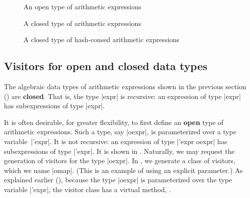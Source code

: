 \documentclass[11pt,a4paper,twoside]{article}
\renewcommand{\emph}[1]{\textbf{#1}}
\begin{document}

\begin{figure}[p]
\vspace{-\baselineskip}
\caption{An open type of arithmetic expressions} %
\label{fig:expr12}
\end{figure}

\begin{figure}[p]
\caption{A closed type of arithmetic expressions}
\label{fig:expr13}
\end{figure}

\begin{figure}[p]
\caption{A closed type of hash-consed arithmetic expressions}
\label{fig:expr08}
\end{figure}

\subsection{Visitors for open and closed data types}
\label{sec:advanced:openclosed}

The algebraic data types of arithmetic expressions shown in the previous
section () are \emph{closed}. That is, the type \oc|expr|
is recursive: an expression of type \oc|expr| has subexpressions of type
\oc|expr|.

It is often desirable, for greater flexibility, to first define an \emph{open}
type of arithmetic expressions. Such a type, say \oc|oexpr|, is parameterized
over a type variable~\oc|'expr|. It is not recursive: an expression of type
\oc|'expr oexpr| has subexpressions of type \oc|'expr|. It is shown in
. Naturally, we may request the generation of visitors for
the type \oc|oexpr|. In , we generate a class of \map
visitors, which we name \oc|omap|. (This is an example of using an explicit
\name parameter.) As explained earlier (),
because the type \oc|oexpr| is parameterized over the type variable
\oc|'expr|, the visitor class has a virtual method, .
\end{document}
